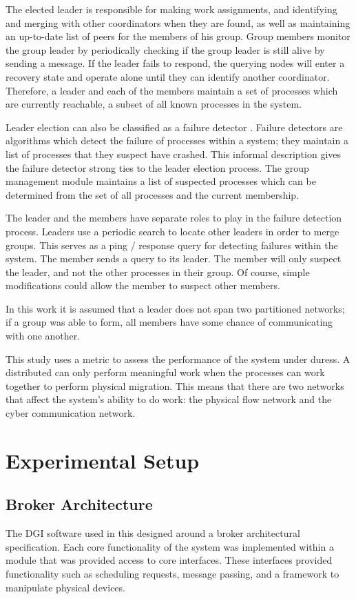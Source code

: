 The elected leader is responsible for making work assignments, and identifying and merging with other coordinators when they are found, as well as maintaining an up-to-date list of peers for the members of his group. 
Group members monitor the group leader by periodically checking if the group leader is still alive by sending a message. 
If the leader fails to respond, the querying nodes will enter a recovery state and operate alone until
they can identify another coordinator.
Therefore, a leader and each of the members maintain a set of processes which are currently reachable, a subset of all known processes in the system.

Leader election can also be classified as a failure detector \cite{LEADERELECTIONEVAL}.
Failure detectors are algorithms which detect the failure of processes within a system; they maintain a list of processes that they suspect have crashed.
This informal description gives the failure detector strong ties to the leader election process. 
The group management module maintains a list of suspected processes which can be determined from the set of all processes and the current membership.

The leader and the members have separate roles to play in the failure detection process.
Leaders use a periodic search to locate other leaders in order to merge groups.
This serves as a ping / response query for detecting failures within the system.
The member sends a query to its leader.
The member will only suspect the leader, and not the other processes in their group.
Of course, simple modifications could allow the member to suspect other members.

In this work it is assumed that a leader does not span two partitioned networks; if a group was able to form, all members have some chance of communicating with one another.

This study uses a metric to assess the performance of the system under duress.
A distributed can only perform meaningful work when the processes can work together to perform physical migration.
This means that there are two networks that affect the system's ability to do work: the physical flow network and the cyber communication network.

\section {Experimental Setup}

\subsection{Broker Architecture}
The DGI software used in this designed around a broker architectural specification.
Each core functionality of the system was implemented within a module that was provided access to core interfaces.
These interfaces provided functionality such as scheduling requests, message passing, and a framework to manipulate physical devices.


